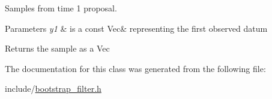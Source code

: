 Samples from time 1 proposal. 


\begin{DoxyParams}{Parameters}
{\em y1} & is a const Vec\& representing the first observed datum \\
\hline
\end{DoxyParams}
\begin{DoxyReturn}{Returns}
the sample as a Vec 
\end{DoxyReturn}


The documentation for this class was generated from the following file\+:\begin{DoxyCompactItemize}
\item 
include/\hyperlink{bootstrap__filter_8h}{bootstrap\+\_\+filter.\+h}\end{DoxyCompactItemize}
